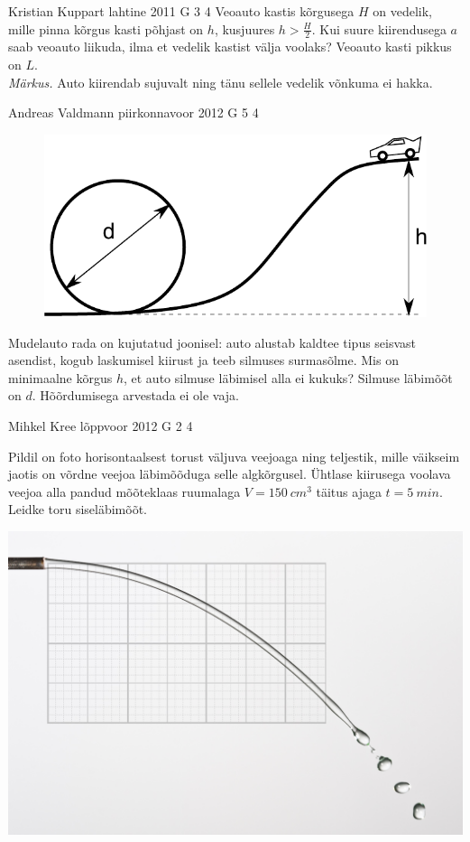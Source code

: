 \documentclass[11pt]{article}
\begin{document}
{%
{Kristian Kuppart} %
{lahtine} %
{2011} %
{G 3} %
{4} %
{
\ifStatement
Veoauto kastis kõrgusega $H$ on vedelik, mille pinna kõrgus kasti põhjast on 
$h$, kusjuures $h > \frac{H}{2}$. Kui suure kiirendusega $a$ saab veoauto 
liikuda, ilma et vedelik kastist välja voolaks? Veoauto kasti pikkus on $L$.\\
\textit{Märkus.} Auto kiirendab sujuvalt ning tänu sellele vedelik võnkuma ei hakka.
\fi
}

{Andreas Valdmann} %
{piirkonnavoor} %
{2012} %
{G 5} %
{4} %
{
\ifStatement
\begin{figure}%
\includegraphics[width=\linewidth]{2012-v2g-05-silmus}%
\end{figure}
Mudelauto rada on kujutatud joonisel: auto alustab kaldtee tipus seisvast
asendist, kogub laskumisel kiirust ja teeb silmuses surmasõlme. Mis on
minimaalne kõrgus $h$, et auto silmuse läbimisel alla ei kukuks? Silmuse
läbimõõt on $d$. Hõõrdumisega arvestada ei ole vaja.
\fi
}

{Mihkel Kree} %
{lõppvoor} %
{2012} %
{G 2} %
{4} %
{
\ifStatement
Pildil on foto horisontaalsest torust väljuva veejoaga ning teljestik, mille
väikseim jaotis on võrdne veejoa läbimõõduga selle algkõrgusel. Ühtlase
kiirusega voolava veejoa alla pandud mõõteklaas ruumalaga
$V=\SI{150}{cm^3}$ täitus ajaga $t=\SI{5}{min}$. Leidke
toru siseläbimõõt.
\begin{center}
\includegraphics[width=0.7\linewidth]{2012-v3g-02-jet}%
\end{center}
\fi
}

}
\end{document}
